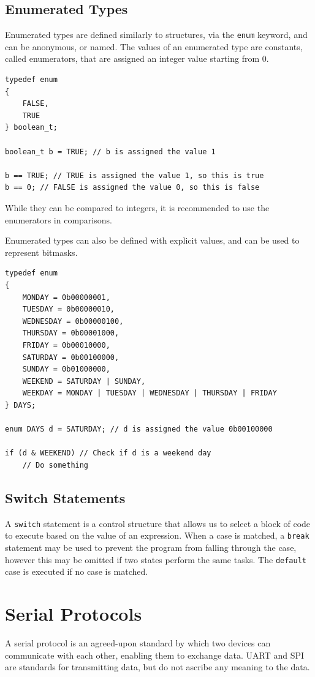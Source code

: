 \documentclass[a4paper]{report}
\begin{document}
\section{Enumerated Types}
Enumerated types are defined similarly to structures, via the \texttt{enum} keyword, and can be anonymous, or named.
The values of an enumerated type are constants, called enumerators, that are assigned an integer value starting from 0.
\begin{verbatim}
typedef enum
{
    FALSE,
    TRUE
} boolean_t;

boolean_t b = TRUE; // b is assigned the value 1

b == TRUE; // TRUE is assigned the value 1, so this is true
b == 0; // FALSE is assigned the value 0, so this is false
\end{verbatim}
While they can be compared to integers, it is recommended to use the enumerators in comparisons.

Enumerated types can also be defined with explicit values, and can be used to represent bitmasks.
\begin{verbatim}
typedef enum
{
    MONDAY = 0b00000001,
    TUESDAY = 0b00000010,
    WEDNESDAY = 0b00000100,
    THURSDAY = 0b00001000,
    FRIDAY = 0b00010000,
    SATURDAY = 0b00100000,
    SUNDAY = 0b01000000,
    WEEKEND = SATURDAY | SUNDAY,
    WEEKDAY = MONDAY | TUESDAY | WEDNESDAY | THURSDAY | FRIDAY
} DAYS;

enum DAYS d = SATURDAY; // d is assigned the value 0b00100000

if (d & WEEKEND) // Check if d is a weekend day
    // Do something
\end{verbatim}
\section{Switch Statements}
A \texttt{switch} statement is a control structure that allows us to select a block of code to execute based on the value of an expression.
When a case is matched, a \texttt{break} statement may be used to prevent the program from falling
through the case, however this may be omitted if two states perform the same tasks. The \texttt{default} case is executed if no case is matched.
\chapter{Serial Protocols}
A serial protocol is an agreed-upon standard by which two devices can communicate with each other, enabling
them to exchange data. UART and SPI are standards for transmitting data, but do not ascribe any meaning to the data.
\end{document}
